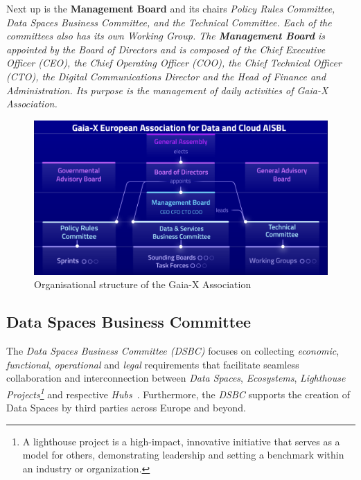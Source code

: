 Next up is the \textbf{Management Board} and its chairs \em \textit{Policy Rules Committee}, \textit{Data Spaces Business Committee}, and the \textit{Technical Committee}.
Each of the committees also has its own \textit{Working Group}.
The \textbf{Management Board} is appointed by the \textit{Board of Directors} and is composed of the Chief Executive Officer (CEO), the Chief Operating Officer (COO), the Chief Technical Officer (CTO), the Digital Communications Director and the Head of Finance and Administration.
Its purpose is the management of daily activities of \textit{Gaia-X Association}.

\begin{figure}
    \centering
    \includegraphics[width=\textwidth]{figures/management-board-structure.png}
    \caption{Organisational structure of the Gaia-X Association~\cite{gaiax}}\label{fig:organisational-board-structure}
\end{figure}

\subsection{Data Spaces Business Committee}\label{subsec:data-spaces-business-committee}

The \textit{Data Spaces Business Committee (DSBC)} focuses on collecting \textit{economic}, \textit{functional}, \textit{operational} and \textit{legal} requirements that facilitate seamless collaboration and interconnection between \textit{Data Spaces}, \textit{Ecosystems}, \textit{Lighthouse Projects\footnote{A lighthouse project is a high-impact, innovative initiative that serves as a model for others, demonstrating leadership and setting a benchmark within an industry or organization.}} and respective \textit{Hubs}~\cite{gaiax}. %
Furthermore, the \textit{DSBC} supports the creation of Data Spaces by third parties across Europe and beyond.

